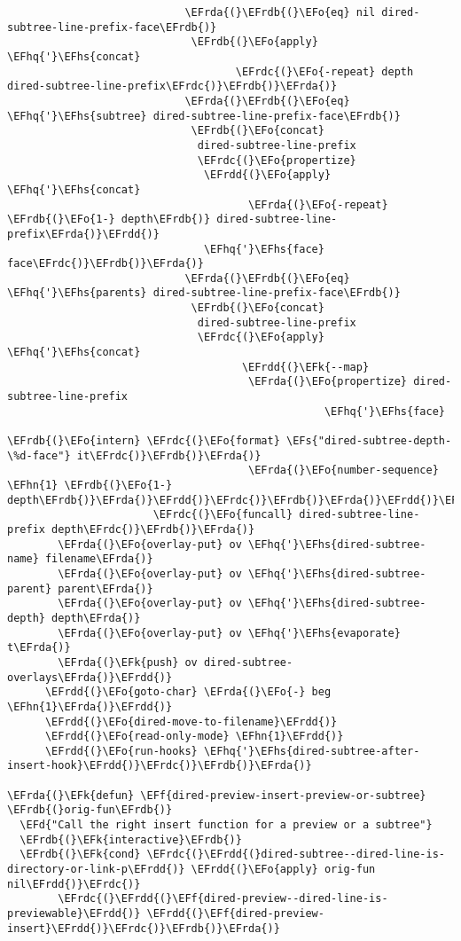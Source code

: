 \documentclass[a4wide,10pt]{article}
\newcommand{\EFs}[1]{\textcolor{EFs}{#1}} %
\newcommand{\EFd}[1]{\textcolor{EFd}{#1}} %
\newcommand{\EFk}[1]{\textcolor{EFk}{#1}} %
\newcommand{\EFf}[1]{\textcolor{EFf}{#1}} %
\newcommand{\EFo}[1]{\textcolor{EFo}{#1}} %
\newcommand{\EFhn}[1]{\textcolor{EFhn}{\textbf{#1}}} %
\newcommand{\EFhq}[1]{\textcolor{EFhq}{#1}} %
\newcommand{\EFhs}[1]{\textcolor{EFhs}{#1}} %
\newcommand{\EFrda}[1]{\textcolor{EFrda}{#1}} %
\newcommand{\EFrdb}[1]{\textcolor{EFrdb}{#1}} %
\newcommand{\EFrdc}[1]{\textcolor{EFrdc}{#1}} %
\newcommand{\EFrdd}[1]{\textcolor{EFrdd}{#1}} %
\begin{document}
\begin{Code}
\begin{Verbatim}
                            \EFrda{(}\EFrdb{(}\EFo{eq} nil dired-subtree-line-prefix-face\EFrdb{)}
                             \EFrdb{(}\EFo{apply} \EFhq{'}\EFhs{concat}
                                    \EFrdc{(}\EFo{-repeat} depth dired-subtree-line-prefix\EFrdc{)}\EFrdb{)}\EFrda{)}
                            \EFrda{(}\EFrdb{(}\EFo{eq} \EFhq{'}\EFhs{subtree} dired-subtree-line-prefix-face\EFrdb{)}
                             \EFrdb{(}\EFo{concat}
                              dired-subtree-line-prefix
                              \EFrdc{(}\EFo{propertize}
                               \EFrdd{(}\EFo{apply} \EFhq{'}\EFhs{concat}
                                      \EFrda{(}\EFo{-repeat} \EFrdb{(}\EFo{1-} depth\EFrdb{)} dired-subtree-line-prefix\EFrda{)}\EFrdd{)}
                               \EFhq{'}\EFhs{face} face\EFrdc{)}\EFrdb{)}\EFrda{)}
                            \EFrda{(}\EFrdb{(}\EFo{eq} \EFhq{'}\EFhs{parents} dired-subtree-line-prefix-face\EFrdb{)}
                             \EFrdb{(}\EFo{concat}
                              dired-subtree-line-prefix
                              \EFrdc{(}\EFo{apply} \EFhq{'}\EFhs{concat}
                                     \EFrdd{(}\EFk{--map}
                                      \EFrda{(}\EFo{propertize} dired-subtree-line-prefix
                                                  \EFhq{'}\EFhs{face}
                                                  \EFrdb{(}\EFo{intern} \EFrdc{(}\EFo{format} \EFs{"dired-subtree-depth-\%d-face"} it\EFrdc{)}\EFrdb{)}\EFrda{)}
                                      \EFrda{(}\EFo{number-sequence} \EFhn{1} \EFrdb{(}\EFo{1-} depth\EFrdb{)}\EFrda{)}\EFrdd{)}\EFrdc{)}\EFrdb{)}\EFrda{)}\EFrdd{)}\EFrdc{)}
                       \EFrdc{(}\EFo{funcall} dired-subtree-line-prefix depth\EFrdc{)}\EFrdb{)}\EFrda{)}
        \EFrda{(}\EFo{overlay-put} ov \EFhq{'}\EFhs{dired-subtree-name} filename\EFrda{)}
        \EFrda{(}\EFo{overlay-put} ov \EFhq{'}\EFhs{dired-subtree-parent} parent\EFrda{)}
        \EFrda{(}\EFo{overlay-put} ov \EFhq{'}\EFhs{dired-subtree-depth} depth\EFrda{)}
        \EFrda{(}\EFo{overlay-put} ov \EFhq{'}\EFhs{evaporate} t\EFrda{)}
        \EFrda{(}\EFk{push} ov dired-subtree-overlays\EFrda{)}\EFrdd{)}
      \EFrdd{(}\EFo{goto-char} \EFrda{(}\EFo{-} beg \EFhn{1}\EFrda{)}\EFrdd{)}
      \EFrdd{(}\EFo{dired-move-to-filename}\EFrdd{)}
      \EFrdd{(}\EFo{read-only-mode} \EFhn{1}\EFrdd{)}
      \EFrdd{(}\EFo{run-hooks} \EFhq{'}\EFhs{dired-subtree-after-insert-hook}\EFrdd{)}\EFrdc{)}\EFrdb{)}\EFrda{)}

\EFrda{(}\EFk{defun} \EFf{dired-preview-insert-preview-or-subtree} \EFrdb{(}orig-fun\EFrdb{)}
  \EFd{"Call the right insert function for a preview or a subtree"}
  \EFrdb{(}\EFk{interactive}\EFrdb{)}
  \EFrdb{(}\EFk{cond} \EFrdc{(}\EFrdd{(}dired-subtree--dired-line-is-directory-or-link-p\EFrdd{)} \EFrdd{(}\EFo{apply} orig-fun nil\EFrdd{)}\EFrdc{)}
        \EFrdc{(}\EFrdd{(}\EFf{dired-preview--dired-line-is-previewable}\EFrdd{)} \EFrdd{(}\EFf{dired-preview-insert}\EFrdd{)}\EFrdc{)}\EFrdb{)}\EFrda{)}


\end{Verbatim}
\end{Code}
\end{document}

